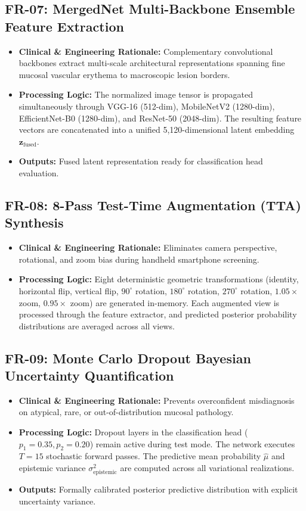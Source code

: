 \documentclass[12pt,a4paper,oneside]{report}
\begin{document}
\subsection{FR-07: MergedNet Multi-Backbone Ensemble Feature Extraction}
\begin{itemize}
    \item \textbf{Clinical \& Engineering Rationale:} Complementary convolutional backbones extract multi-scale architectural representations spanning fine mucosal vascular erythema to macroscopic lesion borders.
    \item \textbf{Processing Logic:} The normalized image tensor is propagated simultaneously through VGG-16 (512-dim), MobileNetV2 (1280-dim), EfficientNet-B0 (1280-dim), and ResNet-50 (2048-dim). The resulting feature vectors are concatenated into a unified 5,120-dimensional latent embedding $\mathbf{z}_{\text{fused}}$.
    \item \textbf{Outputs:} Fused latent representation ready for classification head evaluation.
\end{itemize}

\subsection{FR-08: 8-Pass Test-Time Augmentation (TTA) Synthesis}
\begin{itemize}
    \item \textbf{Clinical \& Engineering Rationale:} Eliminates camera perspective, rotational, and zoom bias during handheld smartphone screening.
    \item \textbf{Processing Logic:} Eight deterministic geometric transformations (identity, horizontal flip, vertical flip, $90^\circ$ rotation, $180^\circ$ rotation, $270^\circ$ rotation, $1.05\times$ zoom, $0.95\times$ zoom) are generated in-memory. Each augmented view is processed through the feature extractor, and predicted posterior probability distributions are averaged across all views.
\end{itemize}

\subsection{FR-09: Monte Carlo Dropout Bayesian Uncertainty Quantification}
\begin{itemize}
    \item \textbf{Clinical \& Engineering Rationale:} Prevents overconfident misdiagnosis on atypical, rare, or out-of-distribution mucosal pathology.
    \item \textbf{Processing Logic:} Dropout layers in the classification head ($p_1 = 0.35, p_2 = 0.20$) remain active during test mode. The network executes $T = 15$ stochastic forward passes. The predictive mean probability $\hat{\mu}$ and epistemic variance $\sigma^2_{\text{epistemic}}$ are computed across all variational realizations.
    \item \textbf{Outputs:} Formally calibrated posterior predictive distribution with explicit uncertainty variance.
\end{itemize}
\end{document}

